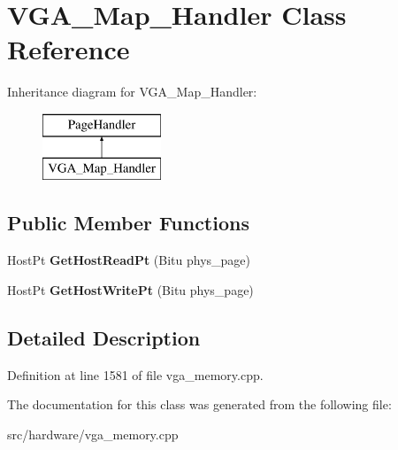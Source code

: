 \hypertarget{classVGA__Map__Handler}{\section{V\-G\-A\-\_\-\-Map\-\_\-\-Handler Class Reference}
\label{classVGA__Map__Handler}
}
Inheritance diagram for V\-G\-A\-\_\-\-Map\-\_\-\-Handler\-:\begin{figure}[H]
\begin{center}
\leavevmode
\includegraphics[height=2.000000cm]{classVGA__Map__Handler}
\end{center}
\end{figure}
\subsection*{Public Member Functions}
\begin{DoxyCompactItemize}
\item 
\hypertarget{classVGA__Map__Handler_a23bc58413fad28c04578297037382551}{Host\-Pt {\bfseries Get\-Host\-Read\-Pt} (Bitu phys\-\_\-page)}\label{classVGA__Map__Handler_a23bc58413fad28c04578297037382551}

\item 
\hypertarget{classVGA__Map__Handler_aaad4aea2654a2d31733a7213894d90a4}{Host\-Pt {\bfseries Get\-Host\-Write\-Pt} (Bitu phys\-\_\-page)}\label{classVGA__Map__Handler_aaad4aea2654a2d31733a7213894d90a4}

\end{DoxyCompactItemize}


\subsection{Detailed Description}


Definition at line 1581 of file vga\-\_\-memory.\-cpp.



The documentation for this class was generated from the following file\-:\begin{DoxyCompactItemize}
\item 
src/hardware/vga\-\_\-memory.\-cpp\end{DoxyCompactItemize}

